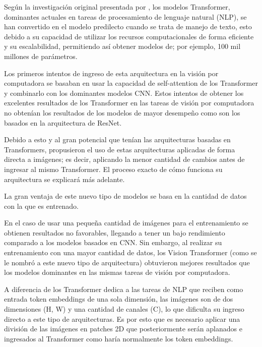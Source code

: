 Según la investigación original presentada por \cite{pr_dosovitskiy2021animageisworth}, los modelos Transformer, dominantes actuales en tareas de procesamiento de lenguaje natural (NLP), se han convertido en el modelo predilecto cuando se trata de manejo de texto, esto debido a su capacidad de utilizar los recursos computacionales de forma eficiente y su escalabilidad, permitiendo así obtener modelos de; por ejemplo, 100 mil millones de parámetros.


Los primeros intentos de ingreso de esta arquitectura en la visión por computadora se basaban en usar la capacidad de self-attention de los Transformer y combinarlo con los dominantes modelos CNN. Estos intentos de obtener los excelentes resultados de los Transformer en las tareas de visión por computadora no obtenían los resultados de los modelos de mayor desempeño como son los basados en la arquitectura de ResNet.

Debido a esto y al gran potencial que tenían las arquitecturas basadas en Transformers, propusieron el uso de estas arquitecturas aplicadas de forma directa a imágenes; es decir, aplicando la menor cantidad de cambios antes de ingresar al mismo Transformer. El proceso exacto de cómo funciona su arquitectura se explicará más adelante.

La gran ventaja de este nuevo tipo de modelos se basa en la cantidad de datos con la que es entrenado. 

En el caso de usar una pequeña cantidad de imágenes para el entrenamiento se obtienen resultados no favorables, llegando a tener un bajo rendimiento comparado a los modelos basados en CNN. Sin embargo, al realizar su entrenamiento con una mayor cantidad de datos, los Vision Transformer (como se le nombró a este nuevo tipo de arquitectura) obtuvieron mejores resultados que los modelos dominantes en las mismas tareas de visión por computadora.

A diferencia de los Transformer dedica a las tareas de NLP que reciben como entrada token embeddings de una sola dimensión, las imágenes son de dos dimensiones (H, W) y una cantidad de canales (C), lo que dificulta su ingreso directo a este tipo de arquitecturas. Es por esto que es necesario aplicar una división de las imágenes en patches 2D que posteriormente serán aplanados e ingresados al Transformer como haría normalmente los token embeddings.

